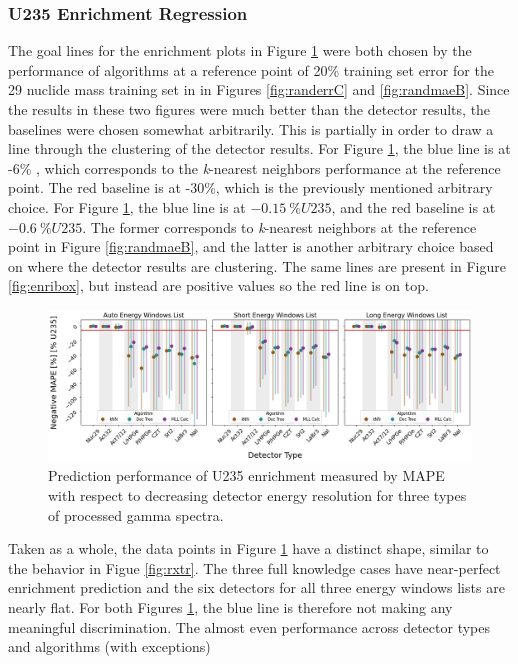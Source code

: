 \subsubsection{U235 Enrichment Regression}

The goal lines for the enrichment plots in Figure \ref{fig:enri} were both
chosen by the performance of algorithms at a reference point of 20\% training
set error for the 29 nuclide mass training set in in Figures \ref{fig:randerrC}
and \ref{fig:randmaeB}.  Since the results in these two figures were much
better than the detector results, the baselines were chosen somewhat
arbitrarily.  This is partially in order to draw a line through the clustering
of the detector results.  For Figure \ref{fig:enri}, the blue line is at -6\%
, which corresponds to the \textit{k}-nearest neighbors performance at the
reference point.  The red baseline is at -30\%, which is the previously
mentioned arbitrary choice.  For Figure \ref{fig:enri}, the blue line is at
$-0.15\:\% U235$, and the red baseline is at $-0.6\:\% U235$.  The former
corresponds to \textit{k}-nearest neighbors at the reference point in Figure
\ref{fig:randmaeB}, and the latter is another arbitrary choice based on where
the detector results are clustering.  The same lines are present in Figure
\ref{fig:enribox}, but instead are positive values so the red line is on top.

\begin{figure}[!htb]
  \centering
  \includegraphics[width=\textwidth]{./chapters/exp2/detector_preds_wrt_enlist_MAPE_enri.png}
  \caption{Prediction performance of \gls{U235} enrichment measured by 
           \gls{MAPE} with respect to decreasing detector energy resolution 
           for three types of processed gamma spectra.}
  \label{fig:enri}
\end{figure}

Taken as a whole, the data points in Figure \ref{fig:enri} have a distinct
shape, similar to the behavior in Figue \ref{fig:rxtr}.  The three full
knowledge cases have near-perfect enrichment prediction and the six detectors
for all three energy windows lists are nearly flat. For both Figures
\ref{fig:enri}, the blue line is therefore not making any
meaningful discrimination. The almost even performance across detector types 
and algorithms (with exceptions) 


